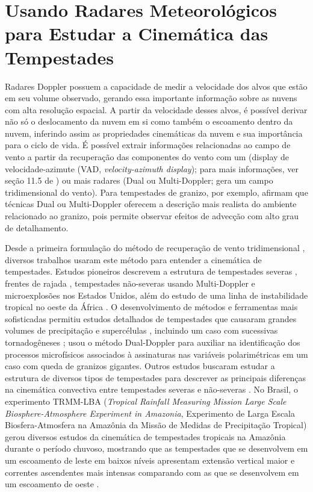 \section{Usando Radares Meteorológicos para Estudar a Cinemática das Tempestades}

Radares Doppler possuem a capacidade de medir a velocidade dos alvos que estão em seu volume observado, gerando essa importante informação sobre as nuvens com alta resolução espacial. A partir da velocidade desses alvos, é possível derivar não só o deslocamento da nuvem em si como também o escoamento dentro da nuvem, inferindo assim as propriedades cinemáticas da nuvem e sua importância para o ciclo de vida. É possível extrair informações relacionadas ao campo de vento a partir da recuperação das componentes do vento com um  (display de velocidade-azimute (VAD, \textit{velocity-azimuth display}); para mais informações, ver seção 11.5 de ) ou mais radares (Dual ou Multi-Doppler; gera um campo tridimensional do vento). Para tempestades de granizo, por exemplo,  afirmam que técnicas Dual ou Multi-Doppler oferecem a descrição mais realista do ambiente relacionado ao granizo, pois permite observar efeitos de advecção com alto grau de detalhamento.

Desde a primeira formulação do método de recuperação de vento tridimensional \cite{Armijo1969}, diversos trabalhos usaram este método para entender a cinemática de tempestades. Estudos pioneiros descrevem a estrutura de tempestades severas \cite{Brandes1977, Ray1980}, frentes de rajada \cite{Weaver1982}, tempestades não-severas usando Multi-Doppler \cite{Ray1978} e microexplosões \cite{Wilson1984} nos Estados Unidos, além do estudo de uma linha de instabilidade tropical no oeste da África \cite{Chong1987}. O desenvolvimento de métodos e ferramentas mais sofisticadas permitiu estudos detalhados de tempestades que causaram grandes volumes de precipitação \cite{Petersen1999a, Calhoun2013} e supercélulas \cite{Potvin2012a, Potvin2012b}, incluindo um caso com sucessivas tornadogêneses \cite{Wurman2007};  usou o método Dual-Doppler para auxiliar na identificação dos processos microfísicos associados à assinaturas nas variáveis polarimétricas em um caso com queda de granizos gigantes. Outros estudos buscaram estudar a estrutura de diversos tipos de tempestades para descrever as principais diferenças na cinemática convectiva entre tempestades severas e não-severas \cite{Lang2002, Deierling2008}. No Brasil, o experimento TRMM-LBA (\textit{Tropical Rainfall Measuring Mission Large Scale Biosphere-Atmosphere Experiment in Amazonia}, Experimento de Larga Escala Biosfera-Atmosfera na Amazônia da Missão de Medidas de Precipitação Tropical) gerou diversos estudos da cinemática de tempestades tropicais na Amazônia durante o período chuvoso, mostrando que as tempestades que se desenvolvem em um escoamento de leste em baixos níveis apresentam extensão vertical maior e correntes ascendentes mais intensas comparando com as que se desenvolvem em um escoamento de oeste \cite{Rutledge2000, Cifelli2002b, Cifelli2004a}.

